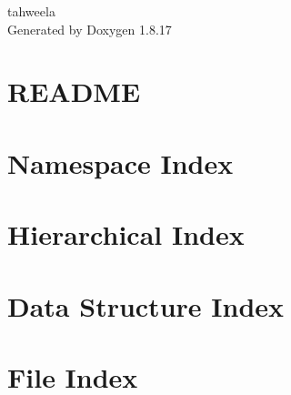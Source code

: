 \let\mypdfximage\pdfximage\def\pdfximage{\immediate\mypdfximage}\documentclass[twoside]{book}
\newcommand{\+}{\discretionary{\mbox{\scriptsize$\hookleftarrow$}}{}{}}
\newcommand{\clearemptydoublepage}{%
  \newpage{\pagestyle{empty}\cleardoublepage}%
}
\begin{document}
\hypersetup{pageanchor=false,
             bookmarksnumbered=true,
             pdfencoding=unicode
            }
\begin{titlepage}
\vspace*{7cm}
\begin{center}%
{\Large tahweela }\\
\vspace*{1cm}
{\large Generated by Doxygen 1.8.17}\\
\end{center}
\end{titlepage}
\clearemptydoublepage
{}
\tableofcontents
\clearemptydoublepage
{}
\hypersetup{pageanchor=true}

\chapter{R\+E\+A\+D\+ME}
\label{md__home_zerin_prj_tahweela__r_e_a_d_m_e}

\chapter{Namespace Index}

\chapter{Hierarchical Index}

\chapter{Data Structure Index}

\chapter{File Index}

\end{document}
